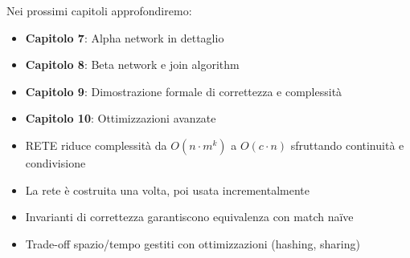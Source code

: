 Nei prossimi capitoli approfondiremo:

\begin{itemize}
\item \textbf{Capitolo 7}: Alpha network in dettaglio
\item \textbf{Capitolo 8}: Beta network e join algorithm
\item \textbf{Capitolo 9}: Dimostrazione formale di correttezza e complessità
\item \textbf{Capitolo 10}: Ottimizzazioni avanzate
\end{itemize}

\begin{successbox}
\begin{itemize}
\item RETE riduce complessità da $O(n \cdot m^k)$ a $O(c \cdot n)$ sfruttando continuità e condivisione
\item La rete è costruita una volta, poi usata incrementalmente
\item Invarianti di correttezza garantiscono equivalenza con match naïve
\item Trade-off spazio/tempo gestiti con ottimizzazioni (hashing, sharing)
\end{itemize}
\end{successbox}

